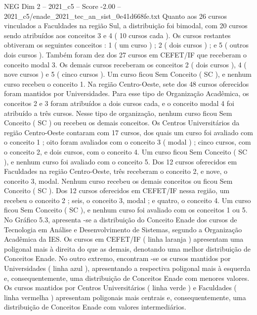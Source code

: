 \begin{textsample}{NEG Dim 2 – 2021\_c5 – Score -2.00 – 2021\_c5/enade\_2021\_tec\_an\_sist\_0e41d668fe.txt}
Quanto aos 26 cursos vinculados a Faculdades na região Sul, a distribuição foi bimodal, com 20 cursos sendo atribuídos aos conceitos 3 e 4 ( 10 cursos cada ).
Os cursos restantes obtiveram os seguintes conceitos : 1 ( um curso ) ; 2 ( dois cursos ) ; e 5 ( outros dois cursos ).
Também foram dez dos 27 cursos em CEFET/IF que receberam o conceito modal 3.
Os demais cursos receberam os conceitos 2 ( dois cursos ), 4 ( nove cursos ) e 5 ( cinco cursos ).
Um curso ficou Sem Conceito ( SC ), e nenhum curso recebeu o conceito 1.
Na região Centro-Oeste, sete dos 48 cursos oferecidos foram mantidos por Universidades.
Para esse tipo de Organização Acadêmica, os conceitos 2 e 3 foram atribuídos a dois cursos cada, e o conceito modal 4 foi atribuído a três cursos.
Nesse tipo de organização, nenhum curso ficou Sem Conceito ( SC ) ou recebeu os demais conceitos.
Os Centros Universitários da região Centro-Oeste contaram com 17 cursos, dos quais um curso foi avaliado com o conceito 1 ; oito foram avaliados com o conceito 3 ( modal ) ; cinco cursos, com o conceito 2, e dois cursos, com o conceito 4.
Um curso ficou Sem Conceito ( SC ), e nenhum curso foi avaliado com o conceito 5.
Dos 12 cursos oferecidos em Faculdades na região Centro-Oeste, três receberam o conceito 2, e nove, o conceito 3, modal.
Nenhum curso recebeu os demais conceitos ou ficou Sem Conceito ( SC ).
Dos 12 cursos oferecidos em CEFET/IF nessa região, um recebeu o conceito 2 ; seis, o conceito 3, modal ; e quatro, o conceito 4.
Um curso ficou Sem Conceito ( SC ), e nenhum curso foi avaliado com os conceitos 1 ou 5.
No Gráfico 5.3, apresenta -se a distribuição do Conceito Enade dos cursos de Tecnologia em Análise e Desenvolvimento de Sistemas, segundo a Organização Acadêmica da IES.
Os cursos em CEFET/IF ( linha laranja ) apresentam uma poligonal mais à direita do que as demais, denotando uma melhor distribuição de Conceitos Enade.
No outro extremo, encontram -se os cursos mantidos por Universidades ( linha azul ), apresentando a respectiva poligonal mais à esquerda e, consequentemente, uma distribuição de Conceitos Enade com menores valores.
Os cursos mantidos por Centros Universitários ( linha verde ) e Faculdades ( linha vermelha ) apresentam poligonais mais centrais e, consequentemente, uma distribuição de Conceitos Enade com valores intermediários.

\end{textsample}
